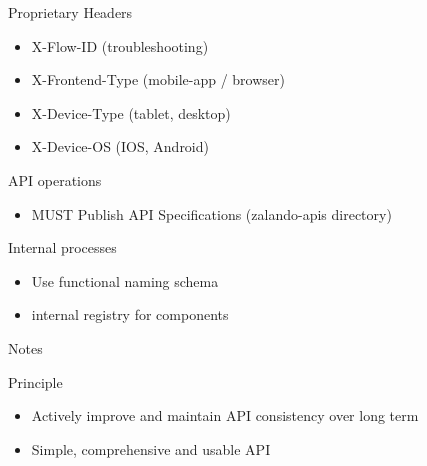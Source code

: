 \documentclass[10pt]{beamer}
\begin{document}
\begin{frame}{Proprietary Headers}

  \begin{itemize}

    \item
          X-Flow-ID (troubleshooting)
    \item
          X-Frontend-Type (mobile-app / browser)
    \item
          X-Device-Type (tablet, desktop)
    \item
          X-Device-OS (IOS, Android)
  \end{itemize}

\end{frame}

\begin{frame}{API operations}

  \begin{itemize}

    \item
          MUST Publish API Specifications (zalando-apis directory)
  \end{itemize}

\end{frame}

\begin{frame}{Internal processes}

  \begin{itemize}

    \item
          Use functional naming schema
    \item
          internal registry for components
  \end{itemize}

\end{frame}

\begin{frame}{Notes}

  \begin{block}{Principle}

    \begin{itemize}

      \item
            Actively improve and maintain API consistency over long term
      \item
            Simple, comprehensive and usable API
    \end{itemize}

  \end{block}

\end{frame}
\end{document}
